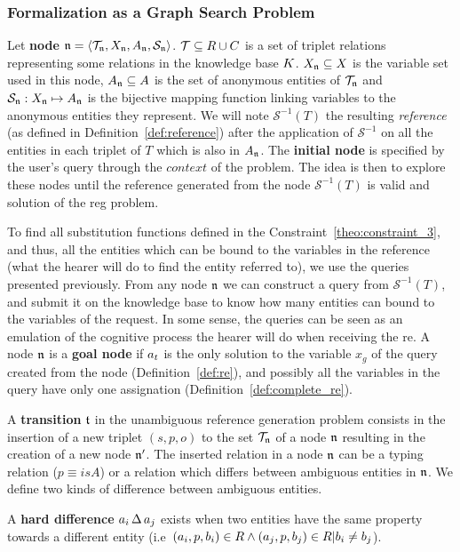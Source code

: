 \documentclass[a4paper,11pt,twoside]{StyleThese}
\begin{document}
\subsubsection{Formalization as a Graph Search Problem}
\label{sec:SCFormalisation}

Let \textbf{node} $\mathfrak{n} = \langle \mathcal{T}_{\mathfrak{n}}, X_{\mathfrak{n}}, A_{\mathfrak{n}}, \mathcal{S}_{\mathfrak{n}} \rangle$. $\mathcal{T} \subseteq R \cup C$ is a set of triplet relations representing some relations in the knowledge base $K$. $X_{\mathfrak{n}} \subseteq X$ is the variable set used in this node, $A_{\mathfrak{n}} \subseteq A$ is the set of anonymous entities of $\mathcal{T}_{\mathfrak{n}}$ and $\mathcal{S}_{\mathfrak{n}}: X_{\mathfrak{n}} \mapsto A_{\mathfrak{n}}$ is the bijective mapping function linking variables to the anonymous entities they represent. We will note $\mathcal{S}^{-1}(T)$ the resulting \textit{reference} (as defined in Definition~\ref{def:reference}) after the application of $\mathcal{S}^{-1}$ on all the entities in each triplet of $T$ which is also in $A_{\mathfrak{n}}$.
The \textbf{initial node} is specified by the user's query through the $context$ of the problem.
The idea is then to explore these nodes until the reference generated from the node $\mathcal{S}^{-1}(T)$ is valid and solution of the \acrshort{reg} problem.
 
To find all substitution functions defined in the Constraint~\ref{theo:constraint_3}, and thus, all the entities which can be bound to the variables in the reference (what the hearer will do to find the entity referred to), we use the \sparql{} queries presented previously. From any node $\mathfrak{n}$ we can construct a \sparql{} query from $\mathcal{S}^{-1}(T)$, and submit it on the knowledge base to know how many entities can bound to the variables of the request. In some sense, the \sparql{} queries can be seen as an emulation of the cognitive process the hearer will do when receiving the \acrshort{re}.
A node $\mathfrak{n}$ is a \textbf{goal node} if $a_t$ is the only solution to the variable $x_g$ of the \sparql{} query created from the node (Definition~\ref{def:re}), and possibly all the variables in the \sparql{} query have only one assignation (Definition~\ref{def:complete_re}).

A \textbf{transition} $\mathfrak{t}$ in the unambiguous reference generation problem consists in the insertion of a new triplet $(s, p, o)$ to the set $\mathcal{T}_{\mathfrak{n}}$ of a node $\mathfrak{n}$ resulting in the creation of a new node $\mathfrak{n}'$. The inserted relation in a node $\mathfrak{n}$ can be a typing relation ($p \equiv isA$) or a relation which differs between ambiguous entities in $\mathfrak{n}$. 
We define two kinds of difference between ambiguous entities.
\begin{definition}
A \textbf{hard difference} $a_i \,\Delta\, a_j$ exists when two entities have the same property towards a different entity (i.e~$(a_i, p, b_i) \in R \land (a_j, p, b_j) \in R | b_i \neq b_j$).
\end{definition}
\end{document}
